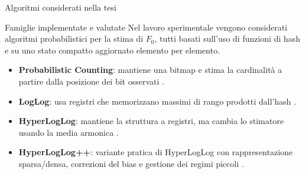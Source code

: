 \documentclass[aspectratio=169,11pt]{beamer}
\newcommand{\Fzero}{F_0}
\begin{document}
\begin{frame}{Algoritmi considerati nella tesi}
  \begin{block}{Famiglie implementate e valutate}
    \small
    Nel lavoro sperimentale vengono considerati algoritmi probabilistici per la
    stima di \(\Fzero\), tutti basati sull'uso di funzioni di hash e su uno stato
    compatto aggiornato elemento per elemento.
  \end{block}

  \vspace{0.1cm}

  \begin{itemize}
    \item \textbf{Probabilistic Counting}: mantiene una bitmap e stima la cardinalit\`a a partire dalla posizione dei bit osservati \cite{Flajolet_Martin_1985}.
    \item \textbf{LogLog}: usa registri che memorizzano massimi di rango prodotti dall'hash \cite{Durand_Flajolet_2003}.
    \item \textbf{HyperLogLog}: mantiene la struttura a registri, ma cambia lo stimatore usando la media armonica \cite{Flajolet_Fusy_Gandouet_Meunier_2007}.
    \item \textbf{HyperLogLog++}: variante pratica di HyperLogLog con rappresentazione sparsa/densa, correzioni del bias e gestione dei regimi piccoli \cite{Heule_Nunkesser_Hall_2013}.
  \end{itemize}
\end{frame}


\end{document}
